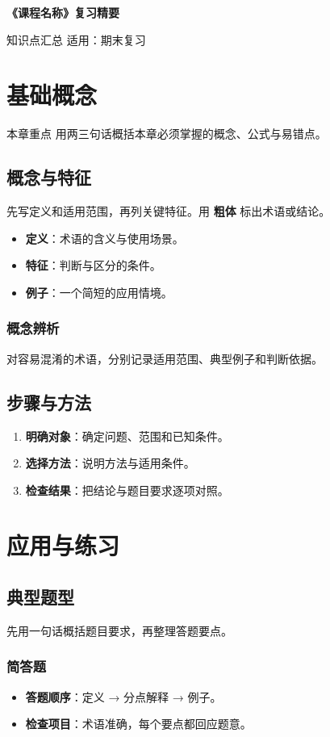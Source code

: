 \documentclass[a4paper,oneside,zihao=5,fontset=fandol]{ctexbook}
\newcommand{\handouttitle}{《课程名称》复习精要}
\newcommand{\handoutsubtitle}{知识点汇总 \quad 适用：期末复习}
\begin{document}
\vspace*{0.8cm}
\begin{center}
  {\Huge\bfseries \handouttitle\par}
  \vspace{0.3cm}
  {\large \handoutsubtitle\par}
\end{center}
\vspace{0.6cm}

\chapter{基础概念}

\begin{mybox}{本章重点}
用两三句话概括本章必须掌握的概念、公式与易错点。
\end{mybox}

\section{概念与特征}

先写定义和适用范围，再列关键特征。用 \textbf{粗体} 标出术语或结论。

\begin{itemize}[left=0pt]
  \item \textbf{定义}：术语的含义与使用场景。
  \item \textbf{特征}：判断与区分的条件。
  \item \textbf{例子}：一个简短的应用情境。
\end{itemize}

\subsection{概念辨析}

对容易混淆的术语，分别记录适用范围、典型例子和判断依据。

\section{步骤与方法}

\begin{enumerate}[left=0pt]
  \item \textbf{明确对象}：确定问题、范围和已知条件。
  \item \textbf{选择方法}：说明方法与适用条件。
  \item \textbf{检查结果}：把结论与题目要求逐项对照。
\end{enumerate}

\chapter{应用与练习}

\section{典型题型}

先用一句话概括题目要求，再整理答题要点。

\subsection{简答题}

\begin{itemize}[left=0pt]
  \item \textbf{答题顺序}：定义 → 分点解释 → 例子。
  \item \textbf{检查项目}：术语准确，每个要点都回应题意。
\end{itemize}
\end{document}
